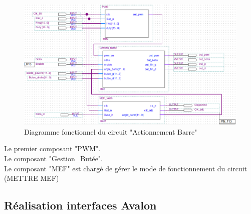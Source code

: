   \begin{figure}[h]
    \begin{center}
      \includegraphics[width=\textwidth]{images/verin.png}
      \caption{Diagramme fonctionnel du circuit "Actionnement Barre"}
    \end{center}
  \end{figure}

  Le premier composant "PWM".\\\newline
  Le composant "Gestion\_Butée".\\\newline
  Le composant "MEF" est chargé de gérer le mode de fonctionnement du circuit (METTRE MEF)

  \subsection{Réalisation interfaces Avalon}

  